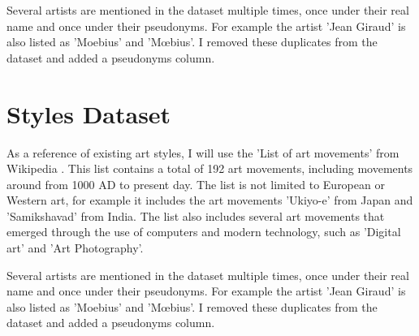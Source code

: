 Several artists are mentioned in the dataset multiple times, once under their real name and once under their pseudonyms. For example the artist 'Jean Giraud' is also listed as 'Moebius' and 'Mœbius'. I removed these duplicates from the dataset and added a pseudonyms column.






\section{Styles Dataset}
\label{cha:Styles Dataset}

As a reference of existing art styles, I will use the 'List of art movements' from Wikipedia \autocite{wikipedia-styles}. This list contains a total of 192 art movements, including movements around from 1000 AD to present day. The list is not limited to European or Western art, for example it includes the art movements 'Ukiyo-e' from Japan and 'Samikshavad' from India. The list also includes several art movements that emerged through the use of computers and modern technology, such as 'Digital art' and 'Art Photography'.





Several artists are mentioned in the dataset multiple times, once under their real name and once under their pseudonyms. For example the artist 'Jean Giraud' is also listed as 'Moebius' and 'Mœbius'. I removed these duplicates from the dataset and added a pseudonyms column.





